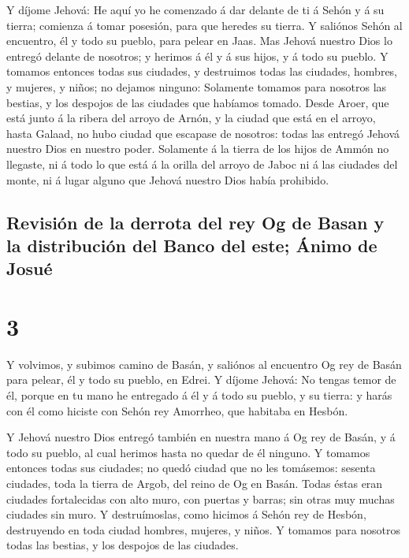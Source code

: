  Y díjome Jehová: He aquí yo he comenzado á dar delante
de ti á Sehón y á su tierra; comienza á tomar posesión, para que heredes
su tierra.  Y saliónos Sehón al encuentro, él y todo su
pueblo, para pelear en Jaas.  Mas Jehová nuestro Dios lo
entregó delante de nosotros; y herimos á él y á sus hijos, y á todo su
pueblo.  Y tomamos entonces todas sus ciudades, y
destruimos todas las ciudades, hombres, y mujeres, y niños; no dejamos
ninguno:  Solamente tomamos para nosotros las bestias, y
los despojos de las ciudades que habíamos tomado.  Desde
Aroer, que está junto á la ribera del arroyo de Arnón, y la ciudad que
está en el arroyo, hasta Galaad, no hubo ciudad que escapase de
nosotros: todas las entregó Jehová nuestro Dios en nuestro poder.
 Solamente á la tierra de los hijos de Ammón no llegaste,
ni á todo lo que está á la orilla del arroyo de Jaboc ni á las ciudades
del monte, ni á lugar alguno que Jehová nuestro Dios había prohibido.

\hypertarget{revisiuxf3n-de-la-derrota-del-rey-og-de-basan-y-la-distribuciuxf3n-del-banco-del-este-uxe1nimo-de-josuuxe9}{%
\subsection{Revisión de la derrota del rey Og de Basan y la distribución
del Banco del este; Ánimo de
Josué}\label{revisiuxf3n-de-la-derrota-del-rey-og-de-basan-y-la-distribuciuxf3n-del-banco-del-este-uxe1nimo-de-josuuxe9}}

\hypertarget{section-2}{%
\section{3}\label{section-2}}

 Y volvimos, y subimos camino de Basán, y saliónos al
encuentro Og rey de Basán para pelear, él y todo su pueblo, en Edrei.
 Y díjome Jehová: No tengas temor de él, porque en tu mano
he entregado á él y á todo su pueblo, y su tierra: y harás con él como
hiciste con Sehón rey Amorrheo, que habitaba en Hesbón.

 Y Jehová nuestro Dios entregó también en nuestra mano á
Og rey de Basán, y á todo su pueblo, al cual herimos hasta no quedar de
él ninguno.  Y tomamos entonces todas sus ciudades; no
quedó ciudad que no les tomásemos: sesenta ciudades, toda la tierra de
Argob, del reino de Og en Basán.  Todas éstas eran
ciudades fortalecidas con alto muro, con puertas y barras; sin otras muy
muchas ciudades sin muro.  Y destruímoslas, como hicimos á
Sehón rey de Hesbón, destruyendo en toda ciudad hombres, mujeres, y
niños.  Y tomamos para nosotros todas las bestias, y los
despojos de las ciudades.

